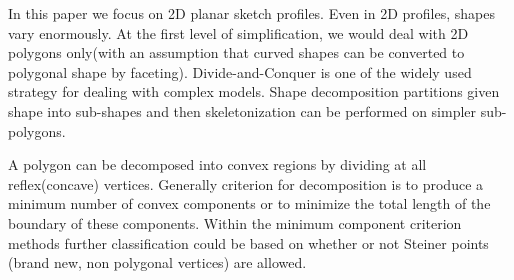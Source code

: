 In this paper we focus on 2D planar sketch profiles.  Even in 2D profiles, shapes vary enormously. At the first level of simplification, we would deal with 2D polygons only(with an assumption that curved shapes can be converted to polygonal shape by faceting). Divide-and-Conquer is one of the widely used strategy for dealing with complex models. Shape decomposition partitions given shape into sub-shapes and then skeletonization can be performed on simpler sub-polygons. 

A polygon can be decomposed into convex regions by dividing at all reflex(concave) vertices. Generally criterion for decomposition is to produce a minimum number of convex components or to minimize the total length of the boundary of these components. Within the minimum component criterion methods further classification could be based on whether or not Steiner points (brand new, non polygonal vertices) are allowed. 

